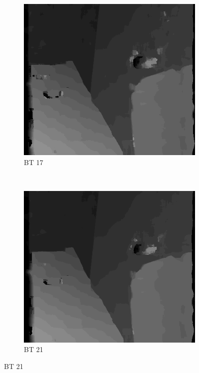 \begin{figure}
\begin{subfigure}[b]{0.23\textwidth}
  \end{subfigure}
  ~
  \begin{subfigure}[b]{0.23\textwidth}
    \centering
    \includegraphics[width=\textwidth]{images/stereo-pairs/venus_bt_17.png}
    \caption{BT 17}
  \end{subfigure}
  ~
  \begin{subfigure}[b]{0.23\textwidth}
    \centering
    \includegraphics[width=\textwidth]{images/stereo-pairs/venus_bt_21.png}
    \caption{BT 21}
  \end{subfigure}


\end{figure}
